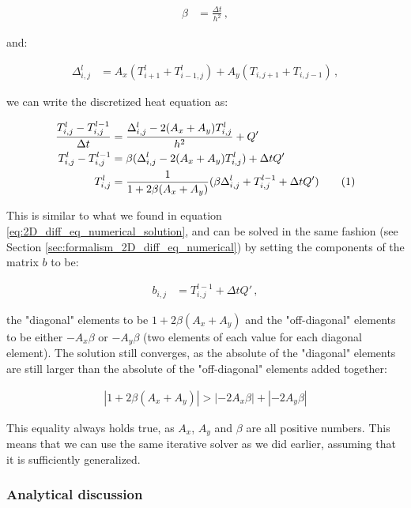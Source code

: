 \documentclass[reprint,english,notitlepage]{revtex4-1}  %
\newcommand\numberthis{\addtocounter{equation}{1}\tag{\theequation}}
\begin{document}
\begin{align*}
\beta &= \frac{\Delta t}{h^2} \, ,
\end{align*}

and:

\begin{align*}
\Delta_{i,j}^l &= A_x(T_{i+1}^l + T_{i-1,j}^l) + A_y(T_{i,j+1} + T_{i,j-1}) \, ,
\end{align*}

we can write the discretized heat equation as:

\begin{align*}
\frac{T_{i,j}^l - T_{i,j}^{l-1}}{\Delta t} &= \frac{\Delta_{i,j}^l - 2(A_x+A_y)T_{i,j}^l}{h^2} + Q' \\
T_{i,j}^l - T_{i,j}^{l-1} &= \beta (\Delta_{i,j}^l - 2(A_x+A_y)T_{i,j}^l) + \Delta t Q' \\
T_{i,j}^l &= \frac{1}{1 + 2\beta (A_x+A_y) } (\beta \Delta_{i,j}^l + T_{i,j}^{l-1} + \Delta t Q') \numberthis \label{eq:heat_eq_with_source_term_numerical_solution}
\end{align*}

This is similar to what we found in equation \eqref{eq:2D_diff_eq_numerical_solution}, and can be solved in the same fashion (see Section \ref{sec:formalism_2D_diff_eq_numerical}) by setting the components of the matrix $b$ to be:

\begin{align*}
b_{i,j} &= T_{i,j}^{l-1} + \Delta t Q' \, ,
\end{align*} 

the "diagonal" elements to be $1 + 2\beta(A_x+A_y)$ and the "off-diagonal" elements to be either $-A_x\beta$ or $-A_y\beta $ (two elements of each value for each diagonal element). The solution still converges, as the absolute of the "diagonal" elements are still larger than the absolute of the "off-diagonal" elements added together:

\begin{align*}
|1 + 2\beta(A_x + A_y)| > |-2A_x \beta| + |-2A_y \beta |
\end{align*}

This equality always holds true, as $A_x$, $A_y$ and $\beta$ are all positive numbers. This means that we can use the same iterative solver as we did earlier, assuming that it is sufficiently generalized.




\subsubsection{Analytical discussion} \label{sec:formalism_heat_eq_with_source_term_analytical_sol}
\end{document}
